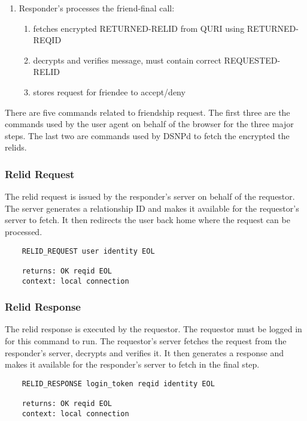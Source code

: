 \documentclass[letterpaper,11pt,oneside]{article}
\begin{document}
\begin{enumerate}
\item Responder's processes the friend-final call:
    \begin{enumerate}
    \item fetches encrypted RETURNED-RELID from QURI using RETURNED-REQID
    \item decrypts and verifies message, must contain correct REQUESTED-RELID
    \item stores request for friendee to accept/deny
    \end{enumerate}
\end{enumerate}

There are five commands related to friendship request. The first three are the
commands used by the user agent on behalf of the browser for the three major
steps. The last two are commands used by DSNPd to fetch the encrypted the
relids.

\subsubsection{Relid Request}

The relid request is issued by the responder's server on behalf of the
requestor. The server generates a relationship ID and makes it available for
the requestor's server to fetch. It then redirects the user back home where the
request can be processed.

\vspace{10pt}
\begin{verbatim}
    RELID_REQUEST user identity EOL

    returns: OK reqid EOL
    context: local connection
\end{verbatim}
\vspace{10pt}

\subsubsection{Relid Response}

The relid response is executed by the requestor. The requestor must be logged
in for this command to run. The requestor's server fetches the request from the
responder's server, decrypts and verifies it. It then generates a response and
makes it available for the responder's server to fetch in the final step.

\vspace{10pt}
\begin{verbatim}
    RELID_RESPONSE login_token reqid identity EOL

    returns: OK reqid EOL
    context: local connection
\end{verbatim}
\vspace{10pt}
\end{document}
